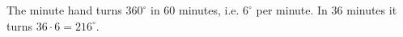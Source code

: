 The minute hand turns $360^\circ$ in $60$ minutes, i.e. $6^\circ$ per minute. In $36$ minutes it turns $36\cdot6=\boxed{216^\circ}$.
